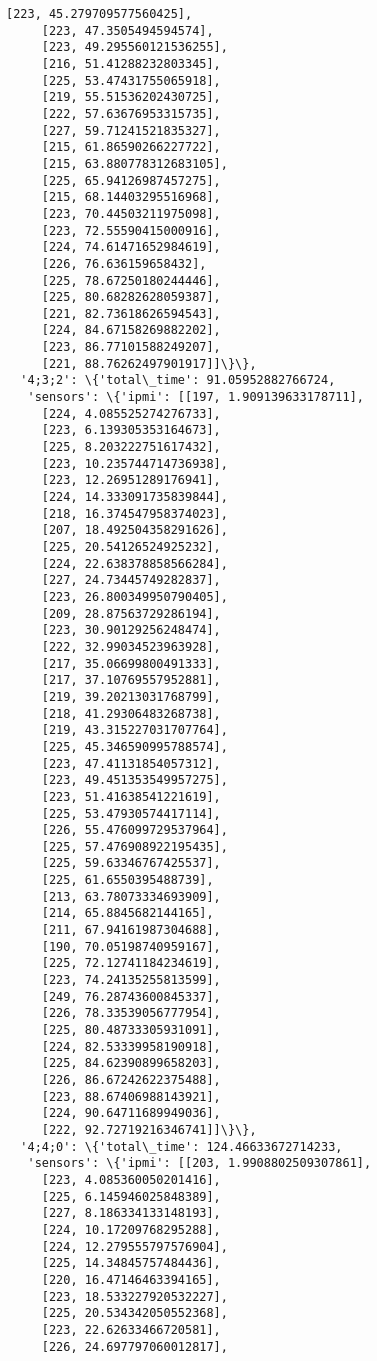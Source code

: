 \documentclass[11pt]{article}
\begin{document}
\begin{tcolorbox}[breakable, size=fbox, boxrule=.5pt, pad at break*=1mm, opacityfill=0]
\begin{Verbatim}[commandchars=\\\{\}]
     [223, 45.279709577560425],
     [223, 47.3505494594574],
     [223, 49.295560121536255],
     [216, 51.41288232803345],
     [225, 53.47431755065918],
     [219, 55.51536202430725],
     [222, 57.63676953315735],
     [227, 59.71241521835327],
     [215, 61.86590266227722],
     [215, 63.880778312683105],
     [225, 65.94126987457275],
     [215, 68.14403295516968],
     [223, 70.44503211975098],
     [223, 72.55590415000916],
     [224, 74.61471652984619],
     [226, 76.636159658432],
     [225, 78.67250180244446],
     [225, 80.68282628059387],
     [221, 82.73618626594543],
     [224, 84.67158269882202],
     [223, 86.77101588249207],
     [221, 88.76262497901917]]\}\},
  '4;3;2': \{'total\_time': 91.05952882766724,
   'sensors': \{'ipmi': [[197, 1.909139633178711],
     [224, 4.085525274276733],
     [223, 6.139305353164673],
     [225, 8.203222751617432],
     [223, 10.235744714736938],
     [223, 12.26951289176941],
     [224, 14.333091735839844],
     [218, 16.374547958374023],
     [207, 18.492504358291626],
     [225, 20.54126524925232],
     [224, 22.638378858566284],
     [227, 24.73445749282837],
     [223, 26.800349950790405],
     [209, 28.87563729286194],
     [223, 30.90129256248474],
     [222, 32.99034523963928],
     [217, 35.06699800491333],
     [217, 37.10769557952881],
     [219, 39.20213031768799],
     [218, 41.29306483268738],
     [219, 43.315227031707764],
     [225, 45.346590995788574],
     [223, 47.41131854057312],
     [223, 49.451353549957275],
     [223, 51.41638541221619],
     [225, 53.47930574417114],
     [226, 55.476099729537964],
     [225, 57.476908922195435],
     [225, 59.63346767425537],
     [225, 61.6550395488739],
     [213, 63.78073334693909],
     [214, 65.8845682144165],
     [211, 67.94161987304688],
     [190, 70.05198740959167],
     [225, 72.12741184234619],
     [223, 74.24135255813599],
     [249, 76.28743600845337],
     [226, 78.33539056777954],
     [225, 80.48733305931091],
     [224, 82.53339958190918],
     [225, 84.62390899658203],
     [226, 86.67242622375488],
     [223, 88.67406988143921],
     [224, 90.64711689949036],
     [222, 92.72719216346741]]\}\},
  '4;4;0': \{'total\_time': 124.46633672714233,
   'sensors': \{'ipmi': [[203, 1.9908802509307861],
     [223, 4.085360050201416],
     [225, 6.145946025848389],
     [227, 8.186334133148193],
     [224, 10.17209768295288],
     [224, 12.279555797576904],
     [225, 14.34845757484436],
     [220, 16.47146463394165],
     [223, 18.533227920532227],
     [225, 20.534342050552368],
     [223, 22.62633466720581],
     [226, 24.697797060012817],

\end{Verbatim}
\end{tcolorbox}
\end{document}

